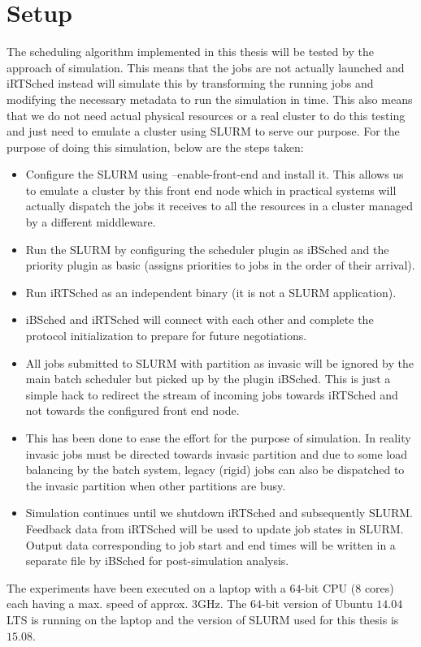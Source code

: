 \section{Setup}
The scheduling algorithm implemented in this thesis will be tested by the approach of simulation. This means that the jobs are not actually launched and iRTSched instead will simulate this by transforming the running jobs and modifying the necessary metadata to run the simulation in time. This also means that we do not need actual physical resources or a real cluster to do this testing and just need to emulate a cluster using SLURM to serve our purpose. For the purpose of doing this simulation, below are the steps taken:
\begin{itemize}
\item Configure the SLURM using --enable-front-end and install it. This allows us to emulate a cluster by this front end node which in practical systems will actually dispatch the jobs it receives to all the resources in a cluster managed by a different middleware.
\item Run the SLURM by configuring the scheduler plugin as iBSched and the priority plugin as basic (assigns priorities to jobs in the order of their arrival).
\item Run iRTSched as an independent binary (it is not a SLURM application).
\item iBSched and iRTSched will connect with each other and complete the protocol initialization to prepare for future negotiations.
\item All jobs submitted to SLURM with partition as invasic will be ignored by the main batch scheduler but picked up by the plugin iBSched. This is just a simple hack to redirect the stream of incoming jobs towards iRTSched and not towards the configured front end node. 
\item This has been done to ease the effort for the purpose of simulation. In reality invasic jobs must be directed towards invasic partition and due to some load balancing by the batch system, legacy (rigid) jobs can also be dispatched to the invasic partition when other partitions are busy. 
\item Simulation continues until we shutdown iRTSched and subsequently SLURM. Feedback data from iRTSched will be used to update job states in SLURM. Output data corresponding to job start and end times will be written in a separate file by iBSched for post-simulation analysis.
\end{itemize}
The experiments have been executed on a laptop with a $64$-bit CPU ($8$ cores) each having a max. speed of approx. $3$GHz. The $64$-bit version of Ubuntu $14.04$ LTS is running on the laptop and the version of SLURM used for this thesis is $15.08$.
